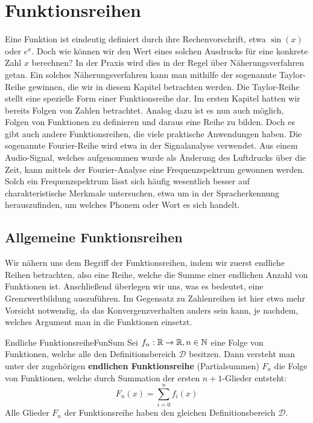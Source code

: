 \chapter{Funktionsreihen}

Eine Funktion ist eindeutig definiert durch ihre Rechenvorschrift, etwa $\sin(x)$ oder $e^x$. Doch wie können wir den Wert eines solchen Ausdrucks für eine konkrete Zahl $x$ berechnen? In der Praxis wird dies in der Regel über Näherungsverfahren getan. Ein solches Näherungsverfahren kann man mithilfe der sogenannte Taylor-Reihe gewinnen, die wir in diesem Kapitel betrachten werden. Die Taylor-Reihe stellt eine spezielle Form einer Funktionsreihe dar. Im ersten Kapitel hatten wir bereits Folgen von Zahlen betrachtet. Analog dazu ist es nun auch möglich, Folgen von Funktionen zu definieren und daraus eine Reihe zu bilden. Doch es gibt auch andere Funktionsreihen, die viele praktische Anwendungen haben. Die sogenannte Fourier-Reihe wird etwa in der Signalanalyse verwendet. Aus einem Audio-Signal, welches aufgenommen wurde als Änderung des Luftdrucks über die Zeit, kann mittels der Fourier-Analyse eine Frequenzspektrum gewonnen werden. Solch ein Frequenzspektrum lässt sich häufig wesentlich besser auf charakteristische Merkmale untersuchen, etwa um in der Spracherkennung herauszufinden, um welches Phonem oder Wort es sich handelt.

\section{Allgemeine Funktionsreihen}

Wir nähern uns dem Begriff der Funktionsreihen, indem wir zuerst endliche Reihen betrachten, also eine Reihe, welche die Summe einer endlichen Anzahl von Funktionen ist. Anschließend überlegen wir uns, was es bedeutet, eine Grenzwertbildung auszuführen. Im Gegensatz zu Zahlenreihen ist hier etwa mehr Vorsicht notwendig, da das Konvergenzverhalten anders sein kann, je nachdem, welches Argument man in die Funktionen einsetzt.

\begin{definition}{Endliche Funktionsreihe}{FunSum}
    Sei $f_n: \mathbb{R} \to \mathbb{R}, n\in\mathbb{N}$  eine Folge von Funktionen, welche alle den Definitionsbereich $\mathcal{D}$ besitzen. Dann versteht man unter der zugehörigen \textbf{endlichen Funktionsreihe} (Partialsummen) $F_n$ die Folge von Funktionen, welche durch Summation der ersten $n+1$-Glieder entsteht:
    $$
        F_n(x) = \sum\limits_{i=0}^n f_{i}(x)
    $$
    Alle Glieder $F_n$ der Funktionsreihe haben den gleichen Definitionsbereich $\mathcal{D}$.
\end{definition}

